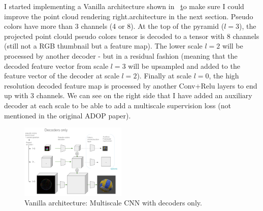 I started implementing a Vanilla architecture shown in ~\href{fig:decoders} to make sure I could improve the point cloud rendering right.architecture in the next section. Pseudo colors have more than 3 channels (4 or 8). At the top of the pyramid ($l=3$), the projected point clould pseudo colors tensor is decoded to a tensor with 8 channels (still not a RGB thumbnail but a feature map). The lower scale $l=2$ will be processed by another decoder - but in a residual fashion (meaning that the decoded feature vector from scale $l=3$ will be upsampled and added to the feature vector of the decoder at scale $l=2$). Finally at scale $l=0$, the high resolution decoded feature map is processed by another Conv+Relu layers to end up with 3 channels. We can see on the right side that I have added an auxiliary decoder at each scale to be able to add a multiscale supervision loss (not mentioned in the original ADOP paper).
\begin{figure}[H]
    \centering
    \includegraphics[width=0.45\textwidth]{figures/multiscale_decoders_only.png}
    \caption{Vanilla architecture: Multiscale CNN with decoders only.}
    \label{fig:decoders}
\end{figure}